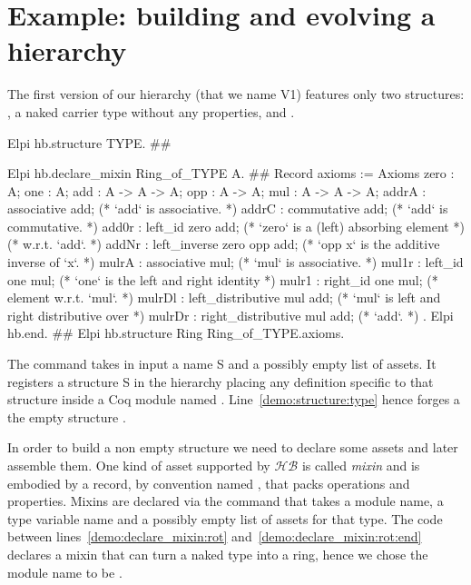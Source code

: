 \documentclass[a4paper,UKenglish,cleveref, autoref]{lipics-v2019}
\newcommand{\HB}{\ensuremath{\mathcal{HB}}}
\begin{document}
\section{Example: building and evolving a hierarchy}

The first version of our hierarchy (that we name V1) features only two
structures: , a naked carrier type without any properties, and
.

\begin{coqcode}
Elpi hb.structure TYPE.                            #\label{demo:structure:type}#

Elpi hb.declare_mixin Ring_of_TYPE A.           #\label{demo:declare_mixin:rot}#
  Record axioms := Axioms {
    zero : A;
    one : A;
    add : A -> A -> A;
    opp : A -> A;
    mul : A -> A -> A;
    addrA : associative add;             (* `add` is associative. *)
    addrC : commutative add;             (* `add` is commutative. *)
    add0r : left_id zero add;            (* `zero` is a (left) absorbing element *)
                                         (* w.r.t. `add`. *)
    addNr : left_inverse zero opp add;   (* `opp x` is the additive inverse of `x`. *)
    mulrA : associative mul;             (* `mul` is associative. *)
    mul1r : left_id one mul;             (* `one` is the left and right identity *)
    mulr1 : right_id one mul;            (* element w.r.t. `mul`. *)
    mulrDl : left_distributive mul add;  (* `mul` is left and right distributive over *)
    mulrDr : right_distributive mul add; (* `add`. *)
  }.
Elpi hb.end.                                #\label{demo:declare_mixin:rot:end}#
Elpi hb.structure Ring Ring_of_TYPE.axioms.
\end{coqcode}

The  command takes in input a name S and a possibly
empty list of assets. It registers a structure S in the hierarchy placing
any definition specific to that structure inside a Coq module named .
Line~\ref{demo:structure:type} hence forges a the empty structure .

In order to build a non empty structure we need to declare some assets and
later assemble them. One kind of asset supported by \HB{} is called
\emph{mixin} and is embodied by a record, by convention named ,
that packs operations and properties.
Mixins are declared via the  command
that takes a module name,
a type variable name and a possibly empty list of assets for that type.
The code between lines~\ref{demo:declare_mixin:rot}
and~\ref{demo:declare_mixin:rot:end} declares a mixin that can turn a naked
type into a ring, hence we chose the module name to be .
\end{document}
